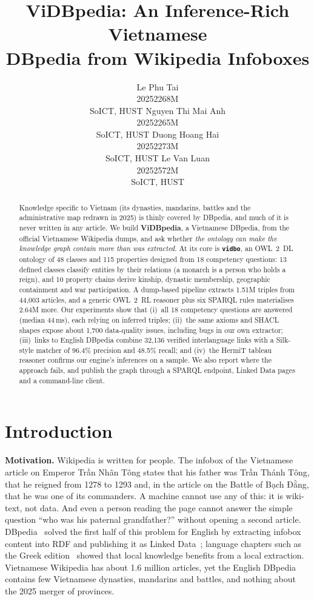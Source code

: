 \documentclass{article}
\title{ViDBpedia: An Inference-Rich Vietnamese\\DBpedia from Wikipedia Infoboxes}
\author{%
  Le Phu Tai\\ 20252268M\\ SoICT, HUST \And
  Nguyen Thi Mai Anh\\ 20252265M\\ SoICT, HUST \And
  Duong Hoang Hai\\ 20252273M\\ SoICT, HUST \And
  Le Van Luan\\ 20252572M\\ SoICT, HUST
}
\newcommand{\ttl}[1]{\texttt{#1}}          %
\newcommand{\vidbo}{\ttl{vidbo}}
\begin{document}
\maketitle

\begin{abstract}
Knowledge specific to Vietnam (its dynasties, mandarins, battles and the administrative map redrawn in 2025) is
thinly covered by DBpedia, and much of it is never written in any article. We build \textbf{ViDBpedia}, a Vietnamese
DBpedia, from the official Vietnamese Wikipedia dumps, and ask whether \emph{the ontology can make the knowledge graph
contain more than was extracted}. At its core is
\textbf{\vidbo}, an OWL~2~DL ontology of 48 classes and 115 properties designed from 18 competency questions: 13
defined classes classify entities by their relations (a monarch is a person who holds a reign), and 10 property chains
derive kinship, dynastic membership, geographic containment and war participation. A dump-based pipeline extracts
1.51M triples from 44{,}003 articles, and a generic OWL~2~RL reasoner plus six SPARQL rules materialises 2.64M more.
Our experiments show that (i)~all 18 competency questions are answered (median 44\,ms), each relying on inferred
triples; (ii)~the same axioms and SHACL shapes expose about 1{,}700 data-quality issues, including bugs in our own
extractor; (iii)~links to English DBpedia combine 32{,}136 verified interlanguage links with a Silk-style matcher of
96.4\% precision and 48.5\% recall; and (iv)~the HermiT tableau reasoner confirms our engine's inferences on a sample.
We also report where the approach fails, and publish the graph through a SPARQL endpoint, Linked Data pages and a
command-line client.
\end{abstract}

\section{Introduction}

\textbf{Motivation.} Wikipedia is written for people. The infobox of the Vietnamese article on Emperor Trần Nhân Tông
states that his father was Trần Thánh Tông, that he reigned from 1278 to 1293 and, in the article on the Battle of
Bạch Đằng, that he was one of its commanders. A machine cannot use any of this: it is wiki-text, not data. And even a
person reading the page cannot answer the simple question ``who was his paternal grandfather?'' without opening a
second article. DBpedia~\cite{auer2007dbpedia,lehmann2015dbpedia} solved the first half of this problem for English by
extracting infobox content into RDF and publishing it as Linked Data~\cite{bernerslee2006linked,heath2011linked};
language chapters such as the Greek edition~\cite{kontokostas2012greek} showed that local knowledge benefits from a
local extraction. Vietnamese Wikipedia has about 1.6 million articles, yet the English DBpedia contains few Vietnamese
dynasties, mandarins and battles, and nothing about the 2025 merger of provinces.
\end{document}
